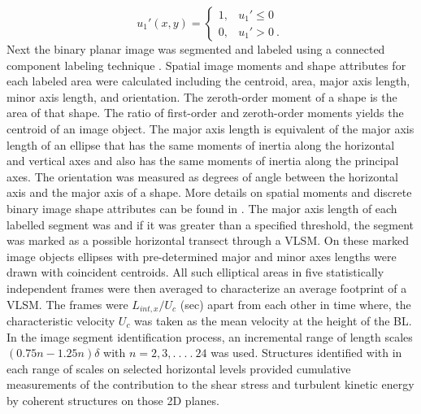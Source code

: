 \documentclass{svjour3}                     %
\begin{document}
\begin{equation}
	u_{1}'(x,y) = \begin{cases}	
	1, &\text{$u_{1}' \leq 0$ }\\
	0, &\text{$u_{1}' >  0$}\ .
	\end{cases}
	\label{case:binary-vel}
\end{equation}
\noindent Next the binary planar image was segmented and labeled using a connected component labeling technique \cite{book_comp_vision_davies}. Spatial image moments and shape attributes for each labeled area were calculated including the centroid, area, major axis length, minor axis length, and orientation. The zeroth-order moment of a shape is the area of that shape. The ratio of first-order and zeroth-order moments yields the centroid of an image object. The major axis length is equivalent of the major axis length of an ellipse that has the same moments of inertia along the horizontal and vertical axes and also has the same moments of inertia along the principal axes. The orientation was measured as degrees of angle between the horizontal axis and the major axis of a shape.  More details on spatial moments and discrete binary image shape attributes can be found in \citet{book_intro_dimg_proc_pratt}. The major axis length of each labelled segment was and if it was greater than a specified threshold, the segment was marked as a possible horizontal transect through a VLSM. On these marked image objects ellipses with pre-determined major and minor axes lengths were drawn with coincident centroids. All such elliptical areas in five statistically independent frames were then averaged to characterize an  average footprint of a VLSM. The frames were $L_{int,x}/U_c$ (sec) apart from each other in time where, the characteristic velocity $U_c$ was taken as the mean velocity at the height of the BL.  In the image segment identification process, an incremental range of length scales $(0.75n-1.25n)\delta $ with $n= 2,3,.\ .\  .\  . \ 24$ was used.  Structures identified with in each  range of scales on selected horizontal levels provided cumulative measurements of the contribution to the shear stress and turbulent kinetic energy by coherent structures on those 2D planes.
\end{document}
